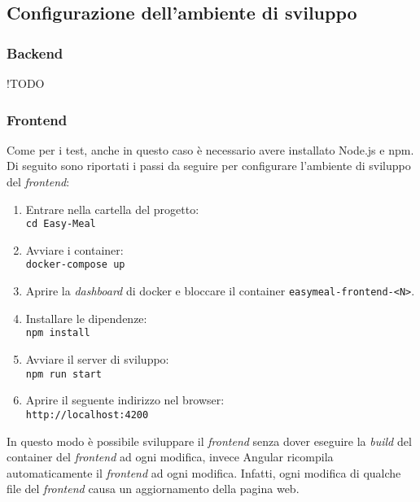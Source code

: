 \subsection{Configurazione dell'ambiente di sviluppo}


\subsubsection{Backend}

!TODO

\subsubsection{Frontend}

Come per i test, anche in questo caso è necessario avere installato Node.js e
npm.
Di seguito sono riportati i passi da seguire per configurare l'ambiente di
sviluppo del \textit{frontend}:

\begin{enumerate}
	\item Entrare nella cartella del progetto: \\
		\texttt{cd Easy-Meal}

	\item Avviare i container: \\
		\texttt{docker-compose up}

	\item Aprire la \textit{dashboard} di docker e bloccare il container
		\texttt{easymeal-frontend-<N>}.

	\item Installare le dipendenze: \\
		\texttt{npm install}

	\item Avviare il server di sviluppo: \\
		\texttt{npm run start}

	\item Aprire il seguente indirizzo nel browser: \\
		\texttt{http://localhost:4200}
\end{enumerate}

In questo modo è possibile sviluppare il \textit{frontend} senza dover eseguire
la \textit{build} del container del \textit{frontend} ad ogni modifica, invece
Angular ricompila automaticamente il \textit{frontend} ad ogni modifica.
Infatti, ogni modifica di qualche file del \textit{frontend} causa un 
aggiornamento della pagina web.
